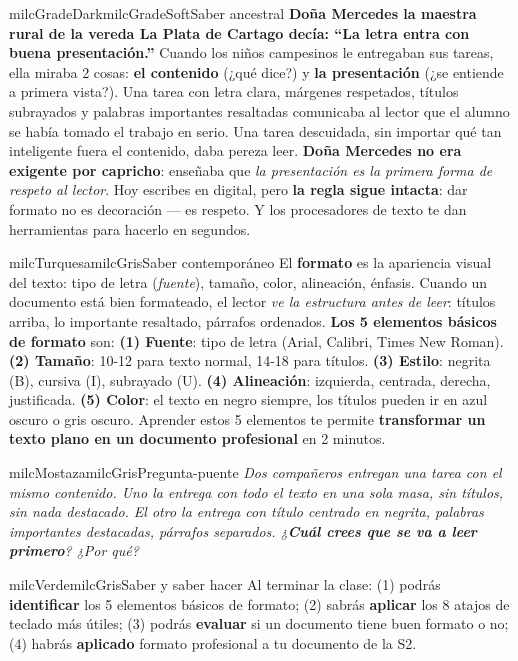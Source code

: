 \documentclass[11pt,letterpaper]{article}
\begin{document}
\begin{softbox}{milcGradeDark}{milcGradeSoft}{Saber ancestral}
\textbf{Doña Mercedes la maestra rural de la vereda La Plata de Cartago decía: ``La letra entra con buena presentación.''} Cuando los niños campesinos le entregaban sus tareas, ella miraba 2 cosas: \textbf{el contenido} (¿qué dice?) y \textbf{la presentación} (¿se entiende a primera vista?). Una tarea con letra clara, márgenes respetados, títulos subrayados y palabras importantes resaltadas comunicaba al lector que el alumno se había tomado el trabajo en serio. Una tarea descuidada, sin importar qué tan inteligente fuera el contenido, daba pereza leer. \textbf{Doña Mercedes no era exigente por capricho}: enseñaba que \emph{la presentación es la primera forma de respeto al lector}. Hoy escribes en digital, pero \textbf{la regla sigue intacta}: dar formato no es decoración --- es respeto. Y los procesadores de texto te dan herramientas para hacerlo en segundos.
\end{softbox}

\begin{softbox}{milcTurquesa}{milcGris}{Saber contemporáneo}
El \textbf{formato} es la apariencia visual del texto: tipo de letra (\emph{fuente}), tamaño, color, alineación, énfasis. Cuando un documento está bien formateado, el lector \emph{ve la estructura antes de leer}: títulos arriba, lo importante resaltado, párrafos ordenados. \textbf{Los 5 elementos básicos de formato} son: \textbf{(1) Fuente}: tipo de letra (Arial, Calibri, Times New Roman). \textbf{(2) Tamaño}: 10-12 para texto normal, 14-18 para títulos. \textbf{(3) Estilo}: negrita (B), cursiva (I), subrayado (U). \textbf{(4) Alineación}: izquierda, centrada, derecha, justificada. \textbf{(5) Color}: el texto en negro siempre, los títulos pueden ir en azul oscuro o gris oscuro. Aprender estos 5 elementos te permite \textbf{transformar un texto plano en un documento profesional} en 2 minutos.
\end{softbox}

\begin{softbox}{milcMostaza}{milcGris}{Pregunta-puente}
\textit{Dos compañeros entregan una tarea con el mismo contenido. Uno la entrega \emph{con todo el texto en una sola masa, sin títulos, sin nada destacado}. El otro la entrega \emph{con título centrado en negrita, palabras importantes destacadas, párrafos separados}. ¿\textbf{Cuál crees que se va a leer primero}? ¿Por qué?}
\end{softbox}

\begin{softbox}{milcVerde}{milcGris}{Saber y saber hacer}
Al terminar la clase: (1) podrás \textbf{identificar} los 5 elementos básicos de formato; (2) sabrás \textbf{aplicar} los 8 atajos de teclado más útiles; (3) podrás \textbf{evaluar} si un documento tiene buen formato o no; (4) habrás \textbf{aplicado} formato profesional a tu documento de la S2.
\end{softbox}
\end{document}

